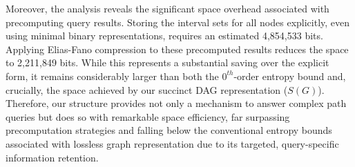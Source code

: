 Moreover, the analysis reveals the significant space overhead associated with precomputing \Rank{} query results. Storing the interval sets for all nodes explicitly, even using minimal binary representations, requires an estimated 4,854,533 bits. Applying Elias-Fano compression to these precomputed results reduces the space to 2,211,849 bits. While this represents a substantial saving over the explicit form, it remains considerably larger than both the $0^{th}$-order entropy bound and, crucially, the space achieved by our succinct DAG representation ($S(G)$). Therefore, our structure provides not only a mechanism to answer complex path queries but does so with remarkable space efficiency, far surpassing precomputation strategies and falling below the conventional entropy bounds associated with lossless graph representation due to its targeted, query-specific information retention.
